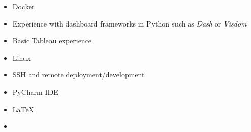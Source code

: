 
\begin{itemize}
\item Docker 

\end{itemize}

\begin{itemize}
\item Experience with dashboard frameworks in Python such as \textit{Dash} or \textit{Visdom}
\item Basic Tableau experience

\end{itemize}

\begin{itemize}
\item Linux {\faLinux}
\item SSH and remote deployment/development
\item PyCharm IDE
\item \LaTeX
\item  {\faGit}
\end{itemize}

%
%






